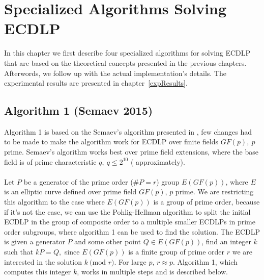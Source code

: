\documentclass[thesis=M,english]{FITthesis}[2012/10/20]
\theoremstyle{remark}
\theoremstyle{definition}
\begin{document}
\chapter{Specialized Algorithms Solving ECDLP}
In this chapter we first describe four specialized algorithms for solving ECDLP that are based on the theoretical concepts presented in the previous chapters. Afterwords, we follow up with the actual implementation's details. The experimental results are presented in chapter~\ref{expResults}.
\section{Algorithm 1 (Semaev 2015)}
Algorithm 1 is based on the Semaev's algorithm presented in \cite{semaev2015}, few changes had to be made to make the algorithm work for ECDLP over finite fields $GF(p),\ p$ prime. Semaev's algorithm works best over prime field extensions, where the base field is of prime characteristic $q,\ q \leq 2^{10}$ ( approximately).  \\ \\
\noindent Let $P$ be a generator of the prime order ($\#P = r$) group $E(GF(p))$, where $E$ is an elliptic curve defined over prime field $GF(p)$, $p$ prime. We are restricting this algorithm to the case where $E(GF(p))$ is a group of prime order, because if it's not the case, we can use the Pohlig-Hellman algorithm to split the initial ECDLP in the group of composite order to a multiple smaller ECDLPs in prime order subgroups, where algorithm 1 can be used to find the solution. The ECDLP is given a generator $P$ and some other point $Q \in E(GF(p))$, find an integer $k$ such that $kP = Q,$ since $E(GF(p))$ is a finite group of prime order $r$ we are interested in the solution $k\ \text{(mod }r)$. For large $p$, $r \approx p$. Algorithm 1, which computes this integer $k$, works in multiple steps and is described below.
\end{document}
